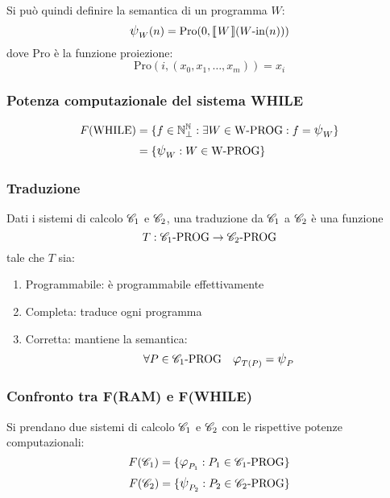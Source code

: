 Si può quindi definire la semantica di un programma $W$:
$$\semanticaWHILE_W(n) = \text{Pro}(0,\opsemWHILE{W}{\text{$W$-in}(n)})$$
dove Pro è la funzione proiezione:
$$ \text{Pro}(i,(x_0,x_1,\dots,x_m)) = x_i $$

\subsubsection*{Potenza computazionale del sistema WHILE}
$$ \begin{aligned}
    F(\text{WHILE}) &= \{ f\in\N^\N_\perp : \exists W\in \text{W-PROG}:f=\semanticaWHILE_W \}\\
    &= \{ \semanticaWHILE_W : W \in \text{W-PROG} \} 
    \end{aligned}
$$

\subsubsection{Traduzione}
Dati i sistemi di calcolo $\mathscr{C}_1$ e $\mathscr{C}_2$, una traduzione da $\mathscr{C}_1$ a $\mathscr{C}_2$ è una funzione
$$ T:\mathscr{C}_1\text{-PROG}\to\mathscr{C}_2\text{-PROG} $$
tale che $T$ sia:
\begin{enumerate}
    \item Programmabile: è programmabile effettivamente
    \item Completa: traduce ogni programma
    \item Corretta: mantiene la semantica:
        $$\forall P\in\SC_1\text{-PROG} \quad \semanticaRAM_{T(P)}=\semanticaWHILE_{P}$$
\end{enumerate}
\subsubsection{Confronto tra F(RAM) e F(WHILE)}
Si prendano due sistemi di calcolo $\mathscr{C}_1$ e $\mathscr{C}_2$ con le rispettive potenze computazionali:
$$ F(\SC_1) = \{\semanticaRAM_{P_1}:P_1\in\SC_1\text{-PROG}\} $$
$$ F(\SC_2) = \{\semanticaWHILE_{P_2}:P_2\in\SC_2\text{-PROG}\} $$

